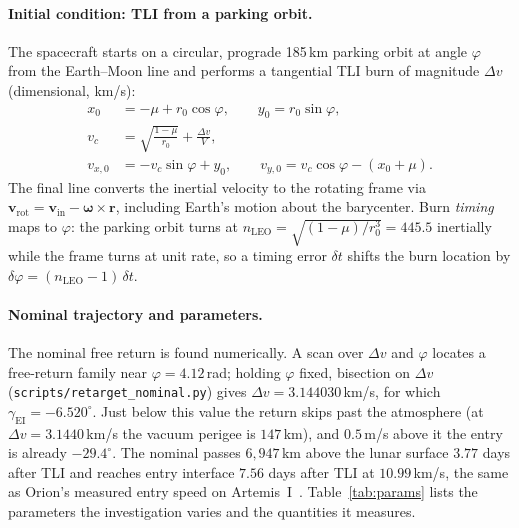 \documentclass[11pt]{article}
\newcommand{\gEI}{\gamma_{\mathrm{EI}}}
\begin{document}
\paragraph{Initial condition: TLI from a parking orbit.} The spacecraft starts on a circular, prograde 185\,km parking orbit at angle $\varphi$ from the Earth--Moon line and performs a tangential TLI burn of magnitude $\Delta v$ (dimensional, km/s):
\begin{equation}
\label{eq:ic}
\begin{aligned}
x_0 &= -\mu + r_0\cos\varphi, \qquad y_0 = r_0\sin\varphi, \\
v_c &= \sqrt{\frac{1-\mu}{r_0}} + \frac{\Delta v}{V}, \\
v_{x,0} &= -v_c \sin\varphi + y_0, \qquad v_{y,0} = v_c\cos\varphi - (x_0+\mu).
\end{aligned}
\end{equation}
The final line converts the inertial velocity to the rotating frame via $\mathbf{v}_{\mathrm{rot}} = \mathbf{v}_{\mathrm{in}} - \boldsymbol{\omega}\times\mathbf{r}$, including Earth's motion about the barycenter. Burn \emph{timing} maps to $\varphi$: the parking orbit turns at $n_{\mathrm{LEO}} = \sqrt{(1-\mu)/r_0^3} = 445.5$ inertially while the frame turns at unit rate, so a timing error $\delta t$ shifts the burn location by $\delta\varphi = (n_{\mathrm{LEO}} - 1)\,\delta t$.

\paragraph{Nominal trajectory and parameters.} The nominal free return is found numerically. A scan over $\Delta v$ and $\varphi$ locates a free-return family near $\varphi = 4.12$\,rad; holding $\varphi$ fixed, bisection on $\Delta v$ (\texttt{scripts/retarget\_nominal.py}) gives $\Delta v = 3.144030$\,km/s, for which $\gEI = -6.520^\circ$. Just below this value the return skips past the atmosphere (at $\Delta v = 3.1440$\,km/s the vacuum perigee is $147$\,km), and $0.5$\,m/s above it the entry is already $-29.4^\circ$. The nominal passes $6{,}947$\,km above the lunar surface $3.77$ days after TLI and reaches entry interface $7.56$ days after TLI at $10.99$\,km/s, the same as Orion's measured entry speed on Artemis~I~\cite{rea_artemis1}. Table~\ref{tab:params} lists the parameters the investigation varies and the quantities it measures.
\end{document}
